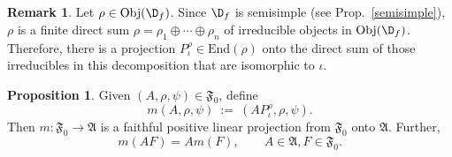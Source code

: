 \documentclass[12pt]{article}
\newcommand{\alg}[1]{\mathfrak{#1}}
\theoremstyle{definition}
\newtheorem{prop}[thm]{Proposition}
\theoremstyle{definition}
\newtheorem{note}[thm]{Remark}
\theoremstyle{remark}
\newenvironment{eqn}{\begin{equation}}{\end{equation}}
\newcommand{\Obj}{\mathrm{Obj}}
\newcommand{\End}{\mathrm{End}}
\begin{document}
\begin{note} Let $\rho \in \Obj (\D _f)$.  Since $\D _f$ is semisimple (see Prop.\
  \ref{semisimple}), $\rho$ is a finite direct sum $\rho =\rho _1\oplus \cdots \oplus
  \rho _n$ of irreducible objects in $\Obj (\D _f)$.  Therefore, there is a
  projection $P_{\iota}^{\rho}\in \End (\rho )$ onto the direct sum of those
  irreducibles in this decomposition that are isomorphic to $\iota$.  \end{note}



\begin{prop} Given $(A,\rho ,\psi )\in \alg{F}_0$, define
  \begin{equation} m(A,\rho ,\psi ) \: := \: (AP_{\iota}^{\rho},\rho ,\psi ) .
  \end{equation} Then $m:\alg{F}_0\to \alg{A}$ is a faithful positive linear
  projection from $\alg{F}_0$ onto $\alg{A}$.  Further,
  \begin{eqn} m(AF)=Am(F) ,\qquad A\in \alg{A},F\in \alg{F}_0  . \label{module}
  \end{eqn} \label{conditional} \end{prop}
\end{document}
